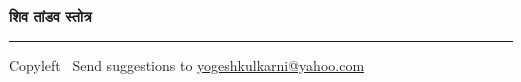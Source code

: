 
\usepackage{polyglossia}
\setdefaultlanguage{sanskrit}

\usepackage{fontspec}
\setmainfont{Segoe UI}
\newfontfamily{}
\newfontfamily{}


\graphicspath{{images/}}



\footnotesize


\begin{center}
\Large{\textbf{शिव तांडव स्तोत्र}}  
\end{center}

\begin{multicols}{2}

\end{multicols}

\rule{\linewidth}{0.25pt}
\scriptsize
Copyleft \textcopyleft\  Send suggestions to 
\href{http://www.yogeshkulkarni.com}{yogeshkulkarni@yahoo.com}


